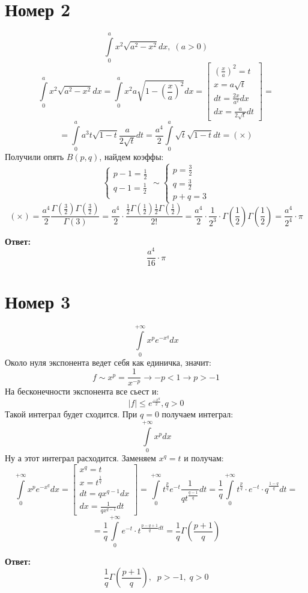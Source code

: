 \documentclass[a4paper,12pt]{article}
\begin{document}
\section*{Номер 2}
\[
\int\limits_0^a x^2 \sqrt{a^2 - x^2} dx, \; (a > 0)
\]
\[
\int\limits_0^a x^2 \sqrt{a^2 - x^2} dx = 
\int\limits_0^a x^2 a\sqrt{1 - \left(\frac{x}{a}\right)^2} dx = 
\begin{bmatrix}
\left(\frac{x}{a}\right)^2 = t \\
x = a \sqrt{t} \\
dt = \frac{2x}{a^2} dx \\
dx = \frac{a}{2\sqrt{t}} dt
\end{bmatrix}
=
\]
\[
=
\int\limits_0^a  a^3 t \sqrt{1 - t} \frac{a}{2\sqrt{t}} dt = 
\frac{a^4}{2} \int\limits_0^a \sqrt{t} \sqrt{1 - t}  dt = (\times)
\]
Получили опять $B(p, q)$, найдем коэффы:
\[
\begin{cases}
p - 1 = \frac{1}{2} \\
q -1 = \frac{1}{2} \\
\end{cases}
\sim
\begin{cases}
p = \frac{3}{2} \\
q= \frac{3}{2} \\ 
p + q = 3
\end{cases}
\]
\[
(\times) = 
\frac{a^4}{2} \frac{\Gamma \left(\frac{3}{2}\right) \Gamma \left(\frac{3}{2}\right)}{\Gamma(3)}
=
\frac{a^4}{2} \cdot \frac{\frac{1}{2} \Gamma \left(\frac{1}{2}\right) \frac{1}{2} \Gamma \left(\frac{1}{2}\right)}{2!} = \frac{a^4}{2} \cdot \frac{1}{2^3} \cdot \Gamma \left(\frac{1}{2}\right) \Gamma \left(\frac{1}{2}\right)
=
\frac{a^4}{2^4} \cdot \pi
\]
\begin{center}
\textbf{Ответ: } 
\[
\frac{a^4}{16} \cdot \pi
\]
\end{center}
\clearpage
\section*{Номер 3}
\[
\int\limits_0^{+\infty} x^p e^{-x^q} dx
\]
Около нуля экспонента ведет себя как единичка, значит:
\[
f \sim x^p = \frac{1}{x^{-p}} \rightarrow -p < 1 \rightarrow p > -1
\]
На бесконечности экспонента все сьест и:
\[
|f| \leq e^{\frac{-x^q}{2}}, q > 0
\]
Такой интеграл будет сходится. При $q = 0$ получаем интеграл:
\[
\int\limits_0^{+\infty} x^p dx 
\]
Ну а этот интеграл расходится. Заменяем $x^q = t$ и получам:
\[
\int\limits_0^{+\infty} x^p e^{-x^q} dx = 
\begin{bmatrix}
x^q = t \\
x = t^{\frac{1}{q}}\\
dt = q x^{q-1} dx \\
dx = \frac{1}{q x^{q-1}}dt
\end{bmatrix}
= 
\int\limits_0^{+\infty} 
t^{\frac{p}{q}} e^{-t} \frac{1}{qt^{\frac{q-1}{q}}} dt = 
\frac{1}{q} \int\limits_0^{+\infty} t^{\frac{p}{q}} \cdot e^{-t} \cdot q^{\frac{1-q}{q}} dt
=
\]
\[
=
\frac{1}{q} \int\limits_0^{+\infty} e^{-t} \cdot t^{\frac{p-q+1}{q}dt} = 
\frac{1}{q} \Gamma \left( \frac{p + 1}{q}\right)
\]
\begin{center}
\textbf{Ответ: } 
\[
\frac{1}{q} \Gamma \left( \frac{p + 1}{q}\right), \; \; p > -1, \; q > 0
\]
\end{center}
\clearpage
\end{document}
